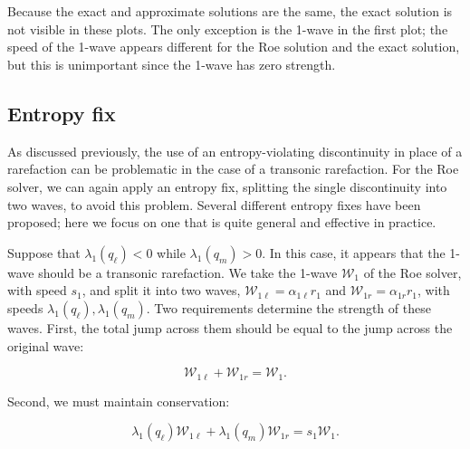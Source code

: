 \documentclass{SIAMbook2016}
\begin{document}
    \begin{center}
    \end{center}
    { \hspace*{\fill} \\}
    
    \begin{center}
    \end{center}
    { \hspace*{\fill} \\}
    
Because the exact and approximate solutions are the same, the exact
solution is not visible in these plots. The only exception is the 1-wave
in the first plot; the speed of the 1-wave appears different for the Roe
solution and the exact solution, but this is unimportant since the
1-wave has zero strength.

\hypertarget{entropy-fix}{%
\subsection{Entropy fix}\label{entropy-fix}}

As discussed previously, the use of an entropy-violating discontinuity
in place of a rarefaction can be problematic in the case of a transonic
rarefaction. For the Roe solver, we can again apply an entropy fix,
splitting the single discontinuity into two waves, to avoid this
problem. Several different entropy fixes have been proposed; here we
focus on one that is quite general and effective in practice.

Suppose that \(\lambda_1(q_\ell) < 0\) while \(\lambda_1(q_m)>0\). In
this case, it appears that the 1-wave should be a transonic rarefaction.
We take the 1-wave \({\mathcal W}_1\) of the Roe solver, with speed
\(s_1\), and split it into two waves,
\({\mathcal W}_{1\ell} = \alpha_{1\ell} r_1\) and
\({\mathcal W}_{1r} = \alpha_{1r} r_1\), with speeds
\(\lambda_1(q_\ell), \lambda_1(q_m)\). Two requirements determine the
strength of these waves. First, the total jump across them should be
equal to the jump across the original wave:

\[{\mathcal W}_{1\ell} + {\mathcal W}_{1r} = {\mathcal W}_1.\]

Second, we must maintain conservation:

\[\lambda_1(q_\ell) {\mathcal W}_{1\ell} + \lambda_1(q_m) {\mathcal W}_{1r} = s_1 {\mathcal W}_1.\]
\end{document}
